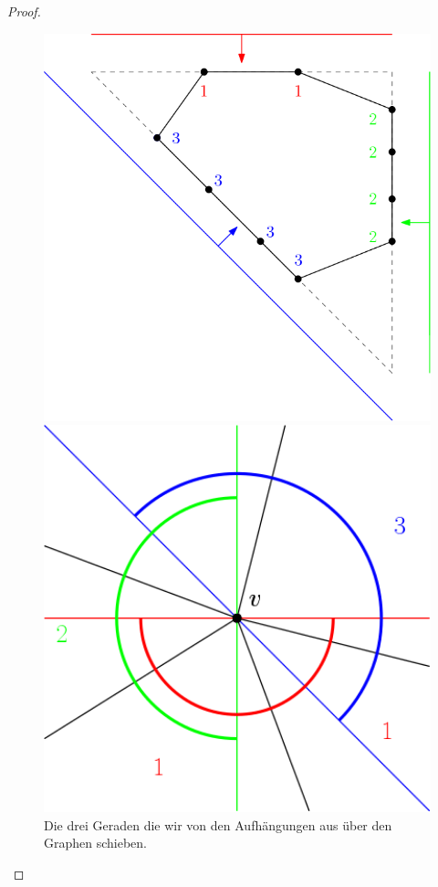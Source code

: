\begin{proof}
\begin{figure}
\centering
\begin{minipage}{0.2\textwidth}
  \end{minipage}
  \begin{minipage}{0.45\textwidth}
  \centering
    \includegraphics[width=1\textwidth]{sweeplines1.png}
    \caption{Die drei Geraden die wir von den Aufhängungen aus über den Graphen schieben.}
    \label{sweeplines1}
  \end{minipage}
  \hfill
  \begin{minipage}{0.45\textwidth}
 \centering
    \includegraphics[width=1\textwidth]{sweeplines2.png}

\end{minipage}
\end{figure}
\end{proof}
